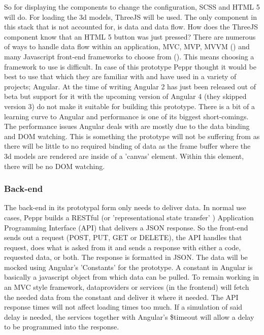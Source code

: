 So for displaying the components to change the configuration, SCSS and HTML 5 will do. For loading the 3d models, ThreeJS will be used. The only component in this stack that is not accounted for, is data and data flow. How does the ThreeJS component know that an HTML 5 button was just pressed? There are numerous of ways to handle data flow within an application, MVC, MVP, MVVM (\cite{MVCMVPMVVM}) and many Javascript front-end frameworks to choose from (\cite{javascriptAnno2016}). This means choosing a framework to use is difficult. In case of this prototype Peppr thought it would be best to use that which they are familiar with and have used in a variety of projects; Angular. At the time of writing Angular 2 has just been released out of beta but support for it with the upcoming version of Angular 4 (they skipped version 3) do not make it suitable for building this prototype.
There is a bit of a learning curve to Angular and performance is one of its biggest short-comings. The performance issues Angular deals with are mostly due to the data binding and DOM watching. This is something the prototype will not be suffering from as there will be little to no required binding of data as the frame buffer where the 3d models are rendered are inside of a 'canvas' element. Within this element, there will be no DOM watching.

\subsubsection{Back-end}
\label{subsub: backEnd}
The back-end in its prototypal form only needs to deliver data. In normal use cases, Peppr builds a RESTful (or 'representational state transfer' \cite{RESTful} ) Application Programming Interface (API) that delivers a JSON response. So the front-end sends out a request (POST, PUT, GET or DELETE), the API handles that request, does what is asked from it and sends a response with either a code, requested data, or both. The response is formatted in JSON. 
The data will be mocked using Angular's 'Constants' for the prototype. A constant in Angular is basically a javascript object from which data can be pulled. To remain working in an MVC style framework, dataproviders or services (in the frontend) will fetch the needed data from the constant and deliver it where it needed. The API response times will not affect loading times too much. If a simulation of said delay is needed, the services together with Angular's \$timeout will allow a delay to be programmed into the response.

